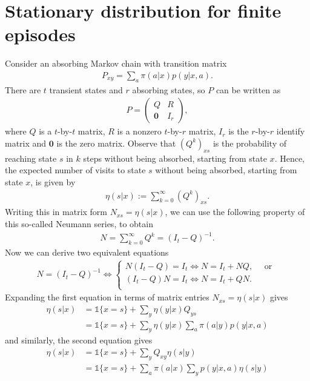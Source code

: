 \documentclass[a4paper]{report}
\theoremstyle{definition}
\theoremstyle{plain}
\begin{document}
\section*{Stationary distribution for finite episodes}
Consider an absorbing Markov chain with transition matrix
\begin{align*}
  P_{xy} = \sum_{a} \pi(a | x) p(y | x, a) .
\end{align*}
There are $t$ transient states and $r$ absorbing states, so $P$ can be written
as
\begin{align*}
  P = \begin{pmatrix}
        Q & R \\
        \mathbf{0} & I_{r}
      \end{pmatrix} ,
\end{align*}
where $Q$ is a $t$-by-$t$ matrix, $R$ is a nonzero $t$-by-$r$ matrix, $I_{r}$ is
the $r$-by-$r$ identify matrix and $\mathbf{0}$ is the zero matrix.
%
Observe that $(Q^{k})_{xs}$ is the probability of reaching state $s$ in $k$
steps without being absorbed, starting from state $x$. Hence, the expected
number of visits to state $s$ without being absorbed, starting from state $x$,
is given by
\begin{align*}
  \eta(s | x) := \sum_{k=0}^{\infty} (Q^{k})_{xs} .
\end{align*}
%
Writing this in matrix form $N_{xs} = \eta(s | x)$, we can use the following
property of this so-called Neumann series, to obtain
\begin{align*}
  N = \sum_{k=0}^{\infty} Q^{k} = {(I_{t} - Q)}^{-1} .
\end{align*}
Now we can derive two equivalent equations
\begin{align*}
  N = (I_{t} - Q)^{-1} \iff
  \begin{cases}
    N (I_{t} - Q) = I_{t} \iff N = I_{t} + NQ ,
    \quad  \text{ or }  \\
    (I_{t} - Q) N = I_{t} \iff N = I_{t} + QN . \\
  \end{cases}
\end{align*}
%
Expanding the first equation in terms of matrix entries $N_{xs} = \eta(s | x)$
gives
\begin{align*}
  \eta(s | x) &= \mathds{1}\{ x = s \} + \sum_{y}  \eta(y | x) Q_{ys} \\
  &= \mathds{1}\{ x = s \} +  \sum_{y}\eta(y | x) \sum_{a} \pi(a | y) p(y | x, a)
\end{align*}
and similarly, the second equation gives
\begin{align*}
  \eta(s | x) &= \mathds{1}\{ x = s \} + \sum_{y} Q_{xy} \eta(s | y) \\
  &= \mathds{1}\{ x = s \} +  \sum_{a} \pi(a | x) \sum_{y} p(y | x, a) \eta(s | y)
\end{align*}
\end{document}
